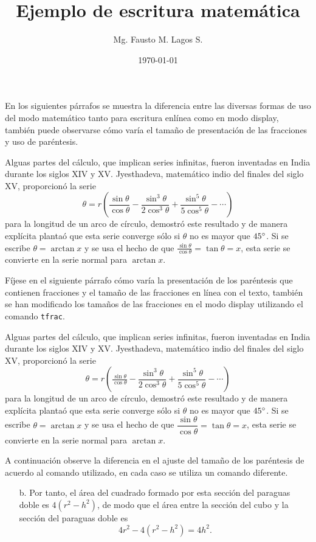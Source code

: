 \documentclass[10pt,a4paper]{article}
\title{Ejemplo de escritura matemática}
\author{Mg. Fausto M. Lagos S.}
\date{\today}
\newcommand{\comment}[1]{\textcolor{gray!75}{#1}}
\begin{document}
\maketitle

\comment{En los siguientes párrafos se muestra la diferencia entre las diversas formas de uso del modo matemático tanto para escritura enlínea como en modo display, también puede observarse cómo varía el tamaño de presentación de las fracciones y uso de paréntesis.}

Alguas partes del cálculo, que implican series infinitas, fueron inventadas en India durante los siglos XIV y XV. Jyesthadeva, matemático indio del finales del siglo XV, proporcionó la serie
\[
\theta = r(\frac{\sin \theta}{\cos \theta} - \frac{\sin^3\theta}{2\cos^3\theta} + \frac{\sin^5\theta}{5\cos^5\theta} - \cdots)
\]
para la longitud de un arco de círculo, demostró este resultado y de manera explícita plantaó que esta serie converge sólo si $\theta$ no es mayor que $45\degree$. Si se escribe $\theta = \arctan x$ y se usa el hecho de que $\frac{\sin \theta}{\cos \theta} = \tan \theta = x$, esta serie se convierte en la serie normal para $\arctan x$.

\comment{Fíjese en el siguiente párrafo cómo varía la presentación de los paréntesis que contienen fracciones y el tamaño de las fracciones en línea con el texto, también se han modificado los tamaños de las fracciones en el modo display utilizando el comando \texttt{tfrac}.}

Alguas partes del cálculo, que implican series infinitas, fueron inventadas en India durante los siglos XIV y XV. Jyesthadeva, matemático indio del finales del siglo XV, proporcionó la serie
\begin{equation}
\theta = r\left(\tfrac{\sin \theta}{\cos \theta} - \frac{\sin^3\theta}{2\cos^3\theta} + \frac{\sin^5\theta}{5\cos^5\theta} - \cdots\right)
\end{equation}
para la longitud de un arco de círculo, demostró este resultado y de manera explícita plantaó que esta serie converge sólo si $\theta$ no es mayor que $45\degree$. Si se escribe $\theta = \arctan x$ y se usa el hecho de que $\dfrac{\sin \theta}{\cos \theta} = \tan \theta = x$, esta serie se convierte en la serie normal para $\arctan x$.

\comment{A continuación observe la diferencia en el ajuste del tamaño de los paréntesis de acuerdo al comando utilizado, en cada caso se utiliza un comando diferente.}

\begin{itemize}
	\item[b.] Por tanto, el área del cuadrado formado por esta sección del paraguas doble es $4(r^2 - h^2)$, de modo que el área entre la sección del cubo  y la sección del paraguas doble es 
	\[
		4r^2 - 4(r^2 - h^2) = 4h^2.
	\]
\end{itemize}
\end{document}
